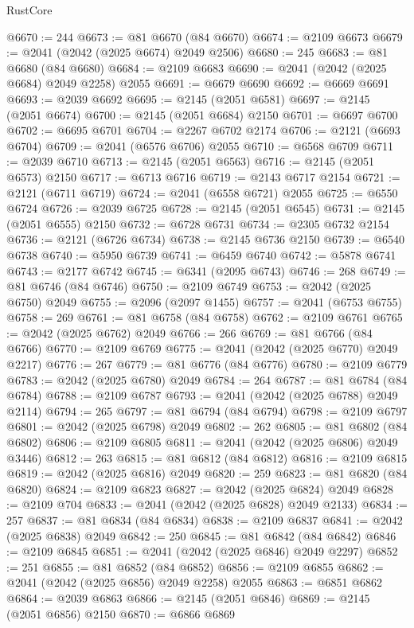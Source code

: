 \begin{lexlean}{RustCore}
\begin{coremodule}
@6670 := 244
@6673 := @81 @6670 (@84 @6670)
@6674 := @2109 @6673
@6679 := @2041 (@2042 (@2025 @6674) @2049 @2506)
@6680 := 245
@6683 := @81 @6680 (@84 @6680)
@6684 := @2109 @6683
@6690 := @2041 (@2042 (@2025 @6684) @2049 @2258) @2055
@6691 := @6679 @6690
@6692 := @6669 @6691
@6693 := @2039 @6692
@6695 := @2145 (@2051 @6581)
@6697 := @2145 (@2051 @6674)
@6700 := @2145 (@2051 @6684) @2150
@6701 := @6697 @6700
@6702 := @6695 @6701
@6704 := @2267 @6702 @2174
@6706 := @2121 (@6693 @6704)
@6709 := @2041 (@6576 @6706) @2055
@6710 := @6568 @6709
@6711 := @2039 @6710
@6713 := @2145 (@2051 @6563)
@6716 := @2145 (@2051 @6573) @2150
@6717 := @6713 @6716
@6719 := @2143 @6717 @2154
@6721 := @2121 (@6711 @6719)
@6724 := @2041 (@6558 @6721) @2055
@6725 := @6550 @6724
@6726 := @2039 @6725
@6728 := @2145 (@2051 @6545)
@6731 := @2145 (@2051 @6555) @2150
@6732 := @6728 @6731
@6734 := @2305 @6732 @2154
@6736 := @2121 (@6726 @6734)
@6738 := @2145 @6736 @2150
@6739 := @6540 @6738
@6740 := @5950 @6739
@6741 := @6459 @6740
@6742 := @5878 @6741
@6743 := @2177 @6742
@6745 := @6341 (@2095 @6743)
@6746 := 268
@6749 := @81 @6746 (@84 @6746)
@6750 := @2109 @6749
@6753 := @2042 (@2025 @6750) @2049
@6755 := @2096 (@2097 @1455)
@6757 := @2041 (@6753 @6755)
@6758 := 269
@6761 := @81 @6758 (@84 @6758)
@6762 := @2109 @6761
@6765 := @2042 (@2025 @6762) @2049
@6766 := 266
@6769 := @81 @6766 (@84 @6766)
@6770 := @2109 @6769
@6775 := @2041 (@2042 (@2025 @6770) @2049 @2217)
@6776 := 267
@6779 := @81 @6776 (@84 @6776)
@6780 := @2109 @6779
@6783 := @2042 (@2025 @6780) @2049
@6784 := 264
@6787 := @81 @6784 (@84 @6784)
@6788 := @2109 @6787
@6793 := @2041 (@2042 (@2025 @6788) @2049 @2114)
@6794 := 265
@6797 := @81 @6794 (@84 @6794)
@6798 := @2109 @6797
@6801 := @2042 (@2025 @6798) @2049
@6802 := 262
@6805 := @81 @6802 (@84 @6802)
@6806 := @2109 @6805
@6811 := @2041 (@2042 (@2025 @6806) @2049 @3446)
@6812 := 263
@6815 := @81 @6812 (@84 @6812)
@6816 := @2109 @6815
@6819 := @2042 (@2025 @6816) @2049
@6820 := 259
@6823 := @81 @6820 (@84 @6820)
@6824 := @2109 @6823
@6827 := @2042 (@2025 @6824) @2049
@6828 := @2109 @704
@6833 := @2041 (@2042 (@2025 @6828) @2049 @2133)
@6834 := 257
@6837 := @81 @6834 (@84 @6834)
@6838 := @2109 @6837
@6841 := @2042 (@2025 @6838) @2049
@6842 := 250
@6845 := @81 @6842 (@84 @6842)
@6846 := @2109 @6845
@6851 := @2041 (@2042 (@2025 @6846) @2049 @2297)
@6852 := 251
@6855 := @81 @6852 (@84 @6852)
@6856 := @2109 @6855
@6862 := @2041 (@2042 (@2025 @6856) @2049 @2258) @2055
@6863 := @6851 @6862
@6864 := @2039 @6863
@6866 := @2145 (@2051 @6846)
@6869 := @2145 (@2051 @6856) @2150
@6870 := @6866 @6869

\end{coremodule}
\end{lexlean}
